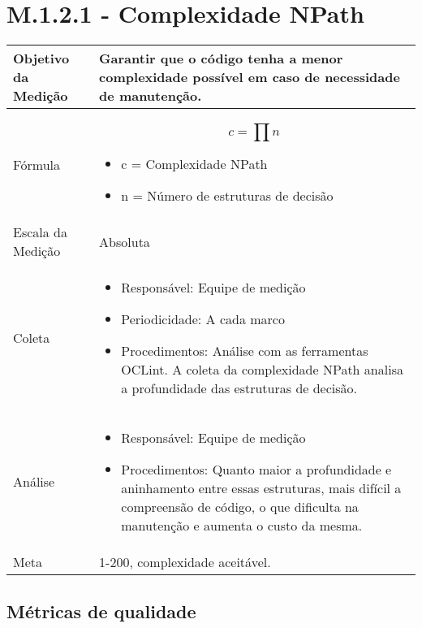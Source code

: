 \section{M.1.2.1 - Complexidade NPath}

	\begin{tabular}{ |p{4cm}|p{8cm}|  }
	 \hline
	 Objetivo da Medição 		& 	  Garantir que o código tenha a menor complexidade possível em caso de necessidade de manutenção. \\
	 \hline
	 Fórmula		& 		\[ c = \prod{n} \] \begin{itemize} \item c = Complexidade NPath 
	 \item n = Número de estruturas de decisão \end{itemize}\\
	 \hline
	 Escala da Medição 		& 		Absoluta \\
	 \hline
	  
	 Coleta		& 		\begin{itemize} \item Responsável: Equipe de medição \item Periodicidade: A cada marco \item Procedimentos: Análise com as ferramentas OCLint. A coleta da complexidade NPath analisa a profundidade das estruturas de decisão. \end{itemize} \\
	 \hline
	 Análise		& 		\begin{itemize} \item Responsável: Equipe de medição \item Procedimentos: Quanto maior a profundidade e aninhamento entre essas estruturas, mais difícil a compreensão de código, o que dificulta na manutenção e aumenta o custo da mesma. \end{itemize} \\
	 \hline
	 Meta		& 	1-200, complexidade aceitável. \\
	 \hline
	\end{tabular}

	\subsection{Métricas de qualidade}


